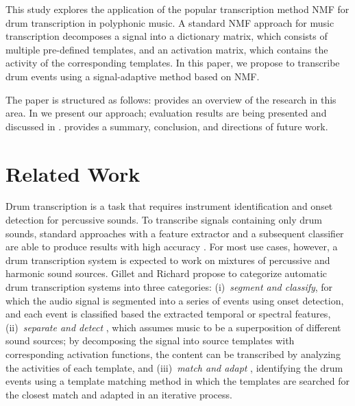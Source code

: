 \documentclass{article}
\begin{document}
This study explores the application of the popular transcription method NMF for drum transcription in polyphonic music. A standard NMF approach for music transcription decomposes a signal into a dictionary matrix, which consists of multiple pre-defined templates, and an activation matrix, which contains the activity of the corresponding templates. In this paper, we propose to transcribe drum events using a signal-adaptive method based on NMF.

The paper is structured as follows:  provides an overview of the research in this area. In  we present our approach; evaluation results are being presented and discussed in .  provides a summary, conclusion, and directions of future work.

\section{Related Work}\label{sec:related works}
Drum transcription is a task that requires instrument identification and onset detection for percussive sounds. To transcribe signals containing only drum sounds, standard approaches with a feature extractor and a subsequent classifier are able to produce results with high accuracy \cite{herrera_automatic_2003}. For most use cases, however, a drum transcription system is expected to work on mixtures of percussive and harmonic sound sources. Gillet and Richard propose to categorize automatic drum transcription systems into three categories:%
    (i)~\textit{segment and classify}\cite{gillet_automatic_2004, tanghe_algorithm_2005, dittmar_drum_2005}, for which the audio signal is segmented into a series of events using onset detection, and each event is classified based the extracted temporal or spectral features, 
    (ii)~\textit{separate and detect} \cite{fitzgerald_drum_2003, paulus_drum_2005,moreau_drum_2007,alves_drum_2009}, which assumes music to be a superposition of different sound sources; by decomposing the signal into source templates with corresponding activation functions, the content can be transcribed by analyzing the activities of each template, and 
    (iii)~\textit{match and adapt} \cite{yoshii_automatic_2004, yoshii_drum_2007}, identifying the drum events using a template matching method in which the templates are searched for the closest match and adapted in an iterative process.
\end{document}
